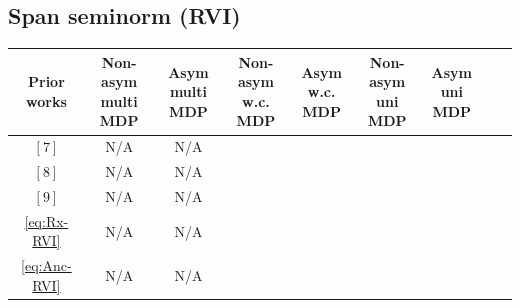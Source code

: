 \documentclass{article} %
\newcommand{\cmark}{\ding{51}}%
\newcommand{\xmark}{\ding{55}}%
\newcommand{\cP}{\mathcal{P}}
\begin{document}
\subsection{Span seminorm (RVI)}
\begin{center}
\begin{tabular}{ |c|c|c|c|c|c|c|c|c| } 
 \hline
  Prior works & \makecell{Non-asym \\ multi MDP}& \makecell{Asym  \\ multi MDP}&  \makecell{Non-asym  \\ w.c. MDP}& \makecell{Asym  \\ w.c. MDP} &
  \makecell{Non-asym  \\ uni MDP}& \makecell{Asym  \\ uni MDP} \\
  \hline 
    $[7]$ & N/A &N/A & \xmark & \xmark & \cmark
    &  \cmark \\    $[8]$& N/A &N/A & \xmark & \xmark & \cmark &  \cmark  \\ 
   $[9]$& N/A &N/A & \xmark & \xmark & \cmark &  \cmark \\
  \hline
  \ref{eq:Rx-RVI}  & N/A &N/A & \cmark & \cmark & \cmark &  \cmark \\
  \ref{eq:Anc-RVI}  & N/A &N/A & \cmark & \cmark & \cmark &  \cmark \\
  \hline
\end{tabular}
\end{center}

\end{document}
